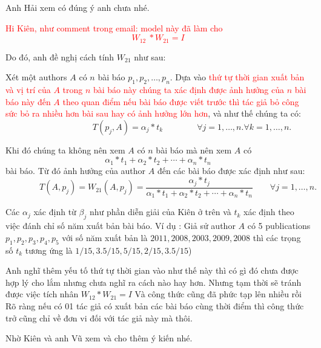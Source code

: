 \documentclass[lnicst]{svmultln}
\begin{document}
Anh Hải xem có đúng ý anh chưa nhé.
%

\textcolor{red}{
Hi Kiên, như comment trong email: model này đã làm cho 
\[W_{12}\ * W_{21} = I\] }

Do đó, anh đề nghị cách tính $W_{21}$ như sau:

Xét một authors $A$ có $n$ bài báo $p_1,p_2,\ldots,p_n$. Dựa vào \textcolor{red}{thứ tự thời gian xuất bản và  vị trí của $A$ trong $n$ bài báo này chúng ta xác định được ảnh hưởng của $n$ bài báo này đến $A$ theo quan điểm nếu bài báo được viết trước thì tác giả bỏ công sức bỏ ra nhiều hơn bài sau hay có ảnh hưởng lớn hơn}, và như thế chúng ta có:
\[\qquad\qquad\qquad\qquad T(p_j,A) = \alpha_j *  t_k \qquad\qquad \forall j = 1,\ldots,n. \forall k = 1,\ldots,n. \]

Khi đó chúng ta không nên xem $A$ có $n$ bài báo mà nên xem $A$ có
\[\alpha_1*t_1 + \alpha_2*t_2 + \cdots + \alpha_n*t_n\]
bài báo. Từ đó ảnh hưởng của author $A$ đến các bài báo được xác định như sau:
\[\qquad\qquad T(A,p_j) = W_{21}(A,p_j) = \frac{\alpha_j*t_j}{\alpha_1*t_1 + \alpha_2*t_2 + \cdots + \alpha_n*t_n} \qquad\forall j = 1,\ldots,n.\]

Các $\alpha_j$ xác định từ $\beta_j$ như phần diễn giải của Kiên ở trên và $t_k$ xác định theo việc đánh chỉ số năm xuất bản bài báo.
Ví dụ : Giả sử author $A$ có 5 publications $p_1, p_2, p_3, p_4, p_5$ với số năm xuất bản là $2011,2008,2003, 2009,2008$ thì các trọng số $t_k$ tương ứng là $1/15,3.5/15,5/15,2/15,3.5/15$)

Anh nghĩ thêm yếu tố thứ tự thời gian vào như thế này thì có gì đó chưa được hợp lý cho lắm nhưng chưa nghĩ ra cách nào hay hơn. Nhưng tạm thời sẽ tránh được việc tích nhân $W_12*W_21=I$ 
Và công thức cũng đã phức tạp lên nhiều rồi 
Rõ ràng nếu có 01 tác giả có xuất bản các bài báo cùng thời điểm thì công thức trở cũng chỉ về đơn vi đối với tác giả này mà thôi.

Nhờ Kiên và anh Vũ xem và cho thêm ý kiến nhé.
\end{document}

